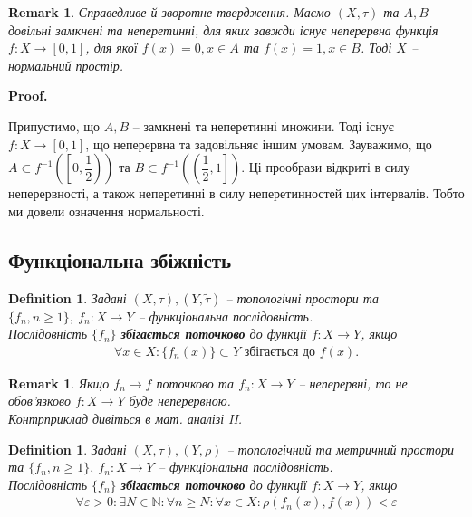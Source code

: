 \documentclass[a4paper, 10pt]{article}
\makeatletter
\theoremstyle{theoremdd}
\newtheorem{definition}[theorem]{Definition}
\newtheorem{remark}[theorem]{Remark}
\renewenvironment{proof}[1][Proof.\\]{\par
\pushQED{\hfill \qed}%
\normalfont \topsep6\p@\@plus6\p@\relax
\trivlist
\item\relax
{\bfseries
#1\@addpunct{.}}\hspace\labelsep\ignorespaces
}{%
\popQED\endtrivlist\@endpefalse
}
\makeatother
\begin{document}
\begin{remark}
Справедливе й зворотне твердження. Маємо $(X,\tau)$ та $A,B$ -- довільні замкнені та неперетинні, для яких завжди існує неперервна функція $f \colon X \to [0,1]$, для якої $f(x) = 0, x \in A$ та $f(x) = 1, x \in B$. Тоді $X$ -- нормальний простір.
\end{remark}

\begin{proof}
Припустимо, що $A,B$ -- замкнені та неперетинні множини. Тоді існує $f \colon X \to [0,1]$, що неперервна та задовільняє іншим умовам. Зауважимо, що $A \subset f^{-1} \left(\left[0, \dfrac{1}{2}\right)\right)$ та $B \subset f^{-1}\left(\left(\dfrac{1}{2},1\right]\right)$. Ці прообрази відкриті в силу неперервності, а також неперетинні в силу неперетинностей цих інтервалів. Тобто ми довели означення нормальності.
\end{proof}

\subsection{Функціональна збіжність}
\begin{definition}
Задані $(X,\tau), (Y,\tilde{\tau})$ -- топологічні простори та $\{f_n, n \geq 1\},\ f_n \colon X \to Y$ -- функціональна послідовність.\\
Послідовність $\{f_n\}$ \textbf{збігається поточково} до функції $f \colon X \to Y$, якщо
\begin{align*}
\forall x \in X: \{f_n(x)\} \subset Y \text{ збігається до } f(x).
\end{align*}
\end{definition}

\begin{remark}
Якщо $f_n \to f$ поточково та $f_n \colon X \to Y$ -- неперервні, то не обов'язково $f \colon X \to Y$ буде неперервною.\\
\textit{Контрприклад дивіться в мат. аналізі II}.
\end{remark}

\begin{definition}
Задані $(X,\tau), (Y,\rho)$ -- топологічний та метричний простори та $\{f_n, n \geq 1\},\ f_n \colon X \to Y$ -- функціональна послідовність.\\
Послідовність $\{f_n\}$ \textbf{збігається поточково} до функції $f \colon X \to Y$, якщо
\begin{align*}
\forall \varepsilon > 0: \exists N \in \mathbb{N}: \forall n \geq N: \forall x \in X: \rho(f_n(x), f(x)) < \varepsilon
\end{align*}
\end{definition}
\end{document}
